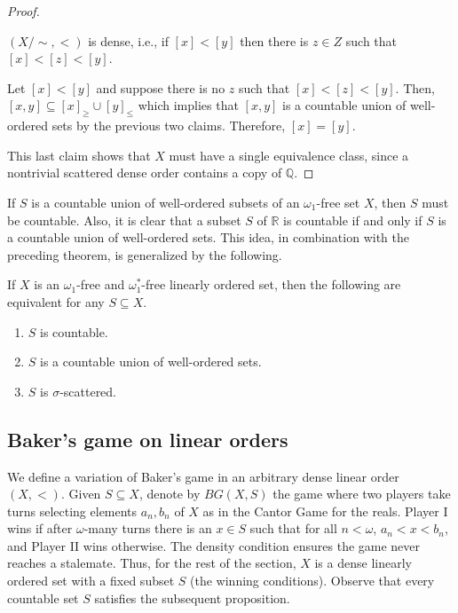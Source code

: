 \begin{proof}
    \begin{claim}
        $(X/\!\sim,<)$ is dense, i.e., if $[x]<[y]$ then there is $z\in Z$ such that $[x]<[z]<[y]$.
    \end{claim}
    \begin{claimproof}
        Let $[x]<[y]$ and suppose there is no $z$ such that $[x]<[z]<[y]$.
        Then, $[x,y]\subseteq [x]_\geq\cup[y]_\leq$ which implies that $[x,y]$ is a countable union of well-ordered sets by the previous two claims.
        Therefore, $[x]=[y]$.
    \end{claimproof}
    This last claim shows that $X$ must have a single equivalence class, since a nontrivial scattered dense order contains a copy of $\mathbb{Q}$.
\end{proof}

If $S$ is a countable union of well-ordered subsets of an $\omega_1$-free set $X$, then $S$ must be countable.
Also, it is clear that a subset $S$ of $\mathbb{R}$ is countable if and only if $S$ is a countable union of well-ordered sets.
This idea, in combination with the preceding theorem, is generalized by the following.

\begin{corollary}\label{cor:sigma-countable}
    If $X$ is an $\omega_1$-free and $\omega_1^*$-free linearly ordered set, then the following are equivalent for any $S\subseteq X$.
    \begin{enumerate}
        \item $S$ is countable.
        \item $S$ is a countable union of well-ordered sets.
        \item $S$ is $\sigma$-scattered.
    \end{enumerate}
\end{corollary}

\subsection{Baker's game on linear orders}\label{sec:linear}
We define a variation of Baker's game in an arbitrary dense linear order $(X,<)$.
Given $S\subseteq X$, denote by $BG(X,S)$ the game where two players take turns selecting elements $a_n,b_n$ of $X$ as in the Cantor Game for the reals.
Player I wins if after $\omega$-many turns there is an $x\in S$ such that for all $n<\omega$, $a_n<x<b_n$, and Player II wins otherwise.
The density condition ensures the game never reaches a stalemate.
Thus, for the rest of the section, $X$ is a dense linearly ordered set with a fixed subset $S$ (the winning conditions).
Observe that every countable set $S$ satisfies the subsequent proposition.

